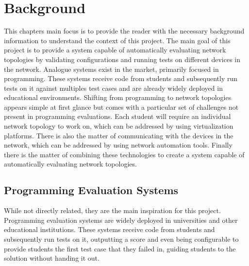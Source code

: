 
\chapter{Background}


\label{ChapterBackground}


This chapters main focus is to provide the reader with the necessary background information to understand the context of
this project. The main goal of this project is to provide a system capable of automatically evaluating network topologies 
by validating configurations and running tests on different devices in the network. Analogue systems exist in the market,
primarily focused in programming. These systems receive code from students and subsequently run tests on it against 
multiples test cases and are already widely deployed in educational environments. 
Shifting from programming to network topologies appears simple at first glance but comes with a particular set of 
challenges not present in programming evaluations. Each student will require an individual network topology to work 
on, which can be addressed by using virtualization platforms. There is also the matter of communicating with the devices 
in the network, which can be addressed by using network automation tools. Finally there is the matter of combining these 
technologies to create a system capable of automatically evaluating network topologies.

\section{Programming Evaluation Systems}
While not directly related, they are the main inspiration for this project. Programming evaluation systems are widely
deployed in universities and other educational institutions. These systems receive code from students and subsequently run
tests on it, outputting a score and even being configurable to provide students the first test case that they failed in, 
guiding students to the solution without handing it out.

